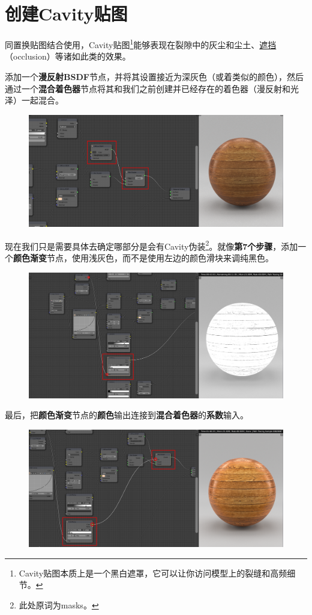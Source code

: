 \documentclass[11pt,a4paper,UTF8]{ctexart}
\begin{document}
\newpage
\section{创建Cavity贴图}
同置换贴图结合使用，Cavity贴图\footnote{Cavity贴图本质上是一个黑白遮罩，它可以让你访问模型上的裂缝和高频细节。}能够表现在裂隙中的灰尘和尘土、\underline{遮挡}（occlusion）等诸如此类的效果。

添加一个\textbf{漫反射BSDF}节点，并将其设置接近为深灰色（或着类似的颜色），然后通过一个\textbf{混合着色器}节点将其和我们之前创建并已经存在的着色器（漫反射和光泽）一起混合。
\begin{figure}[hb]
    \centering
    \includegraphics[scale=0.41]{step8_1.png}
\end{figure}

现在我们只是需要具体去确定哪部分是会有Cavity伪装\footnote{此处原词为masks。}。就像\textbf{第7个步骤}，添加一个\textbf{颜色渐变}节点，使用浅灰色，而不是使用左边的颜色滑块来调纯黑色。
\begin{figure}[hb]
    \centering
    \includegraphics[scale=0.41]{step8_2.png}
\end{figure}

\newpage
最后，把\textbf{颜色渐变}节点的\textbf{颜色}输出连接到\textbf{混合着色器}的\textbf{系数}输入。
\begin{figure}[hb]
    \centering
    \includegraphics[scale=0.41]{step8_3.png}
\end{figure}
\end{document}
